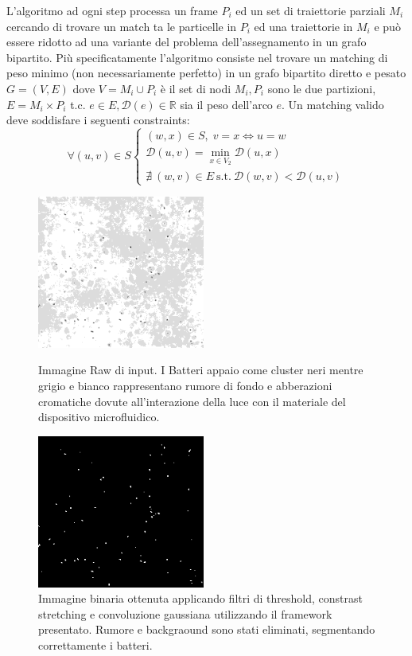 L'algoritmo ad ogni step processa un frame $P_i$ ed un set di traiettorie parziali $M_i$ cercando di trovare un match ta le particelle in $P_i$ ed una traiettorie in $M_i$ e può essere ridotto ad una variante del problema dell'assegnamento in un grafo bipartito.
Più specificatamente l'algoritmo consiste nel trovare un matching di peso minimo (non necessariamente perfetto) in un grafo bipartito diretto e pesato $G=(V,E)$ dove $V={M_i} \cup P_i$ è il set di nodi ${M_i}, P_i$ sono le due partizioni, $E = {M_i} \times P_i$ t.c. $e \in E, \mathcal{D}(e) \in \mathbb{R}$ sia il peso dell'arco $e$.
Un matching valido deve soddisfare i seguenti constraints: 
\begin{equation}
\forall (u,v) \in S 
\left\{
\begin{array}{lr}
(w,x) \in S,\; v=x\Longleftrightarrow u=w\\
\mathcal{D}(u,v) = \min_{x \in V_2} \mathcal{D}(u,x)  \\
\nexists \: (w,v) \in E \: \mbox{s.t.} \: \mathcal{D}(w,v) < \mathcal{D}(u,v)
\end{array}
\right.
\label{matchConstraints}
\end{equation}
\begin{figure}[!htbp]
	\begin{minipage}[l]{0.5\textwidth}
		\centering
		\includegraphics[width=5.5cm]{images/bacteriasmall}
		\caption{Immagine Raw di input. I Batteri appaio come cluster neri mentre grigio e bianco rappresentano rumore di fondo e abberazioni cromatiche dovute all'interazione della luce con il materiale del dispositivo microfluidico. } \label{AAA}
	\end{minipage}   
	\hfill{}
	\begin{minipage}[r]{0.5\textwidth}
		\centering
		\includegraphics[width=5.5cm]{images/bacteriasmall_threshold}
		\caption{Immagine binaria ottenuta applicando filtri di threshold, constrast stretching e convoluzione gaussiana utilizzando il framework presentato. Rumore e backgraound sono stati eliminati, segmentando correttamente i batteri.} \label{BBB}
	\end{minipage}
\end{figure}
